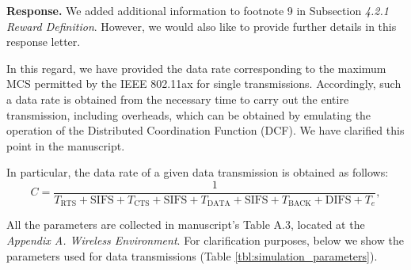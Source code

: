 \documentclass[a4paper,twoside,11pt]{reviewresponse}
\begin{document}
	
	\textbf{Response.} We added additional information to footnote 9 in Subsection \textit{4.2.1 Reward Definition}. However, we would also like to provide further details in this response letter. 
	
	In this regard, we have provided the data rate corresponding to the maximum MCS permitted by the IEEE 802.11ax for single transmissions. Accordingly, such a data rate is obtained from the necessary time to carry out the entire transmission, including overheads, which can be obtained by emulating the operation of the Distributed Coordination Function (DCF). We have clarified this point in the manuscript. 
	
	In particular, the data rate of a given data transmission is obtained as follows:
	\begin{equation}
	    C = \frac{1}{T_{\text{RTS}} + \text{SIFS} + T_{\text{CTS}} + \text{SIFS} + T_{\text{DATA}} + \text{SIFS} + T_{\text{BACK}} + \text{DIFS} + T_e}, 
	\end{equation}
	
	All the parameters are collected in manuscript's Table A.3, located at the \textit{Appendix A. Wireless Environment}. For clarification purposes, below we show the parameters used for data transmissions (Table \ref{tbl:simulation_parameters}).
	
\end{document}
